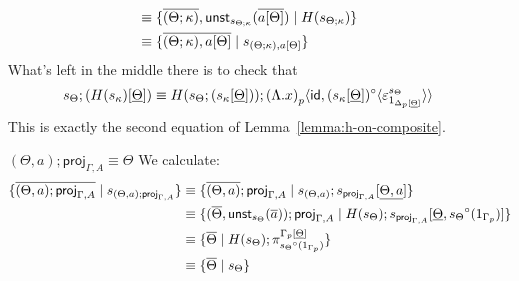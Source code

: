 \documentclass[10pt]{article}
\theoremstyle{definition}
\newcommand\UnSt[2]{\ensuremath{\mathsf{unst}_{#1}(#2)}}
\newcommand\TrCirc[2]{\ensuremath{{#1}^\circ(#2)}}
\newcommand\proj[1]{\ensuremath{\mathsf{proj}_{#1}}}
\newcommand{\id}{\mathsf{id}}
\newcommand\ap[2]{\ensuremath{#1 \langle #2 \rangle }}
\begin{document}
\begin{enumerate}[style = multiline, labelwidth = 80pt]
\begin{align*}
&\equiv \{ \upstairs{(\Theta ; \kappa)} , \UnSt{s_{\Theta;\kappa}}{\upstairs{a[\Theta]}} \mid H(s_{\Theta;\kappa})\} \\
&\equiv \{ \upstairs{(\Theta ; \kappa) , a[\Theta]} \mid s_{(\Theta ; \kappa) , a[\Theta]} \}
\end{align*}
What's left in the middle there is to check that
\begin{align*}
s_\Theta ; (H(s_\kappa)[\downstairs{\Theta}]) \equiv H(s_\Theta ; (s_\kappa[\downstairs{\Theta}])) ; \ap{\asdep{(\Lambda.x)}}{\id, \ap{(s_\kappa[\downstairs{\Theta}])^\circ}{\varepsilon^{s_\Theta}_{1_{\asdep{\Delta}[\downstairs{\Theta}]}}}}
\end{align*}
This is exactly the second equation of Lemma~\ref{lemma:h-on-composite}.

\item[{$(\Theta, a);\proj{\Gamma,A} \equiv \Theta$}] We calculate:
\begin{align*}
\{ \upstairs{(\Theta, a);\proj{\Gamma,A}} \mid s_{(\Theta, a);\proj{\Gamma,A}} \}
&\equiv \{ \upstairs{(\Theta, a)};\proj{\Gamma,A} \mid s_{(\Theta, a)};s_{\proj{\Gamma,A}}[\downstairs{\Theta, a}] \} \\
&\equiv \{ (\upstairs{\Theta}, \UnSt{s_\Theta}{\upstairs{a}});\proj{\Gamma,A} \mid H(s_\Theta);s_{\proj{\Gamma,A}}[\downstairs{\Theta}, \TrCirc{s_\Theta}{1_{\asdep{\Gamma}}}] \} \\
&\equiv \{ \upstairs{\Theta} \mid H(s_\Theta); \pi^{\asdep{\Gamma}[\downstairs{\Theta}]}_{\TrCirc{s_\Theta}{1_{\asdep{\Gamma}}}} \} \\
&\equiv \{ \upstairs{\Theta} \mid s_\Theta \}
\end{align*}


\end{enumerate}
\end{document}
